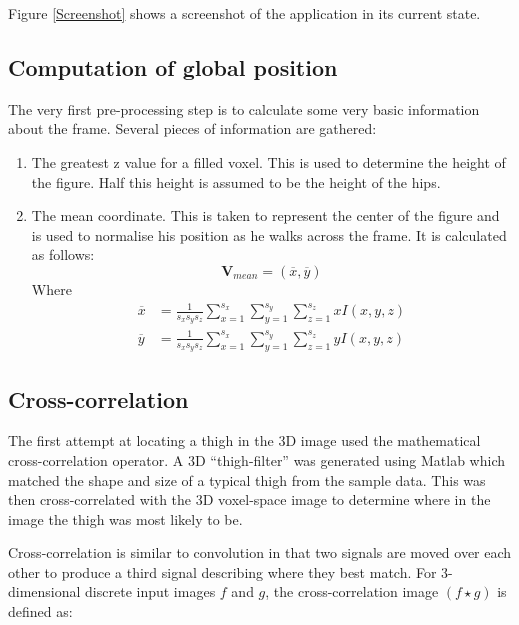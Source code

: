 Figure \ref{Screenshot} shows a screenshot of the application in its current state.


\subsection{Computation of global position}\label{LocatingCenter}

The very first pre-processing step is to calculate some very basic information about the frame.
Several pieces of information are gathered:

\begin{enumerate}
	\item The greatest z value for a filled voxel.
		This is used to determine the height of the figure.
		Half this height is assumed to be the height of the hips.
	\item The mean coordinate.
		This is taken to represent the center of the figure and is used to normalise his position as he walks across the frame.
		It is calculated as follows:
		\begin{equation}
			\mathbf{V}_{mean} = (\overline{x}, \overline{y})
		\end{equation}
		Where
		\begin{align}
			\overline{x} &= \frac{1}{s_x s_y s_z} \sum_{x=1}^{s_x} \sum_{y=1}^{s_y} \sum_{z=1}^{s_z} x I(x,y,z) \\
			\overline{y} &= \frac{1}{s_x s_y s_z} \sum_{x=1}^{s_x} \sum_{y=1}^{s_y} \sum_{z=1}^{s_z} y I(x,y,z)
		\end{align}

\end{enumerate}


\subsection{Cross-correlation}\label{sec:CC}

The first attempt at locating a thigh in the 3D image used the mathematical cross-correlation operator.
A 3D ``thigh-filter'' was generated using Matlab which matched the shape and size of a typical thigh from the sample data.
This was then cross-correlated with the 3D voxel-space image to determine where in the image the thigh was most likely to be.

\bigskip
\noindent Cross-correlation is similar to convolution in that two signals are moved over each other to produce a third signal describing where they best match.
For 3-dimensional discrete input images $f$ and $g$, the cross-correlation image $(f \star g)$ is defined as:

